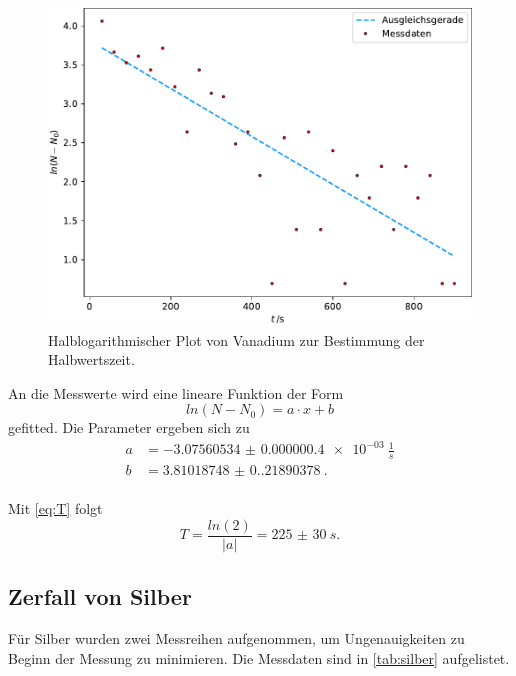 \begin{figure}[H]
  \includegraphics[width=\linewidth]{plots/vanadium.pdf}
  \caption{Halblogarithmischer Plot von Vanadium zur Bestimmung der Halbwertszeit.}
  \label{fig:vanadium}
\end{figure}

An die Messwerte wird eine lineare Funktion der Form
\begin{equation*}
  ln(N-N_0) = a\cdot x + b
\end{equation*}
gefitted. Die Parameter ergeben sich zu 
\begin{align*}
  a &= \SI{-3.07560534(0.4)e-03}{\frac{1}{s}}\\
  b &= \SI{3.81018748(0.21890378)}{}.\\
\end{align*}

Mit \autoref{eq:T} folgt 
\begin{equation*}
  T = \frac{ln(2)}{|a|} = \SI{225(30)}{s}.
\end{equation*}

\subsection{Zerfall von Silber}
Für Silber wurden zwei Messreihen aufgenommen, um Ungenauigkeiten zu Beginn der Messung
zu minimieren. Die Messdaten sind in \autoref{tab:silber} aufgelistet.

